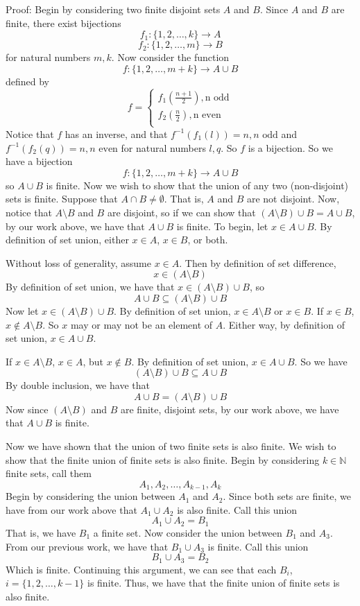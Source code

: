 \documentclass{article}
\begin{document}
\begin{enumerate}
Proof: Begin by considering two finite disjoint sets $A$ and $B$. Since $A$ and $B$ are finite, there exist bijections 
\[f_1 : \{1, 2, \ldots, k\} \to A\]
\[f_2: \{1, 2, \ldots, m\} \to B\]
for natural numbers $m,k$. Now consider the function 
\[f:\{1,2,\ldots, m+k\} \to A \cup B\]
defined by
\[f = \begin{cases}
    f_1(\frac{n+1}{2}), \text{n odd}\\
    f_2(\frac{n}{2}), \text{n even}\\
\end{cases}\]
Notice that $f$ has an inverse, and that $f^{-1}(f_1(l)) = n, \text{$n$ odd}$ and $f^{-1}(f_2(q)) = n, \text{$n$ even}$ for natural numbers $l,q$. So $f$ is a bijection. So we have a bijection
\[f: \{1, 2, \ldots, m+k\} \to A \cup B\]
so $A \cup B$ is finite.
\newline\newline
\hspace{10mm} Now we wish to show that the union of any two (non-disjoint) sets is finite.
\newline
Suppose that $A \cap B \neq \emptyset$. That is, $A$ and $B$ are not disjoint. Now, notice that $A \setminus B$ and $B$ are disjoint, so if we can show that $(A \setminus B) \cup B = A \cup B$, by our work above, we have that $A \cup B$ is finite. To begin, let $x \in A \cup B$. By definition of set union, either $x \in A$, $x \in B$, or both. 

Without loss of generality, assume $x \in A$. Then by definition of set difference,
\[x \in (A \setminus B)\]
By definition of set union, we have that $x \in (A \setminus B) \cup B$, so 
\[A \cup B \subseteq (A \setminus B) \cup B\]
Now let $x \in (A \setminus B) \cup B$. By definition of set union, $x \in A \setminus B$ or $x \in B$. If $x \in B$, $x \notin A \setminus B$. So $x$ may or may not be an element of $A$. Either way, by definition of set union, $x \in A \cup B$. 

If $x \in A \setminus B$, $x \in A$, but $x \notin B$. By definition of set union, $x \in A \cup B$. So we have
\[(A \setminus B) \cup B \subseteq A \cup B\]
By double inclusion, we have that
\[A \cup B = (A \setminus B) \cup B\]
Now since $(A \setminus B)$ and $B$ are finite, disjoint sets, by our work above, we have that $A \cup B$ is finite.
\newline

Now we have shown that the union of two finite sets is also finite. We wish to show that the finite union of finite sets is also finite. Begin by considering $k \in \mathbb{N}$ finite sets, call them
\[A_1, A_2, \ldots, A_{k-1}, A_k\]
Begin by considering the union between $A_1$ and $A_2$. Since both sets are finite, we have from our work above that $A_1 \cup A_2$ is also finite. Call this union
\[A_1 \cup A_2 = B_1\]
That is, we have $B_1$ a finite set. Now consider the union between $B_1$ and $A_3$. From our previous work, we have that $B_1 \cup A_3$ is finite. Call this union
\[B_1 \cup A_3 = B_2\]
Which is finite. Continuing this argument, we can see that each $B_i$, $i = \{1, 2, \ldots, k-1\}$ is finite. Thus, we have that the finite union of finite sets is also finite.
\end{enumerate}
\end{document}
